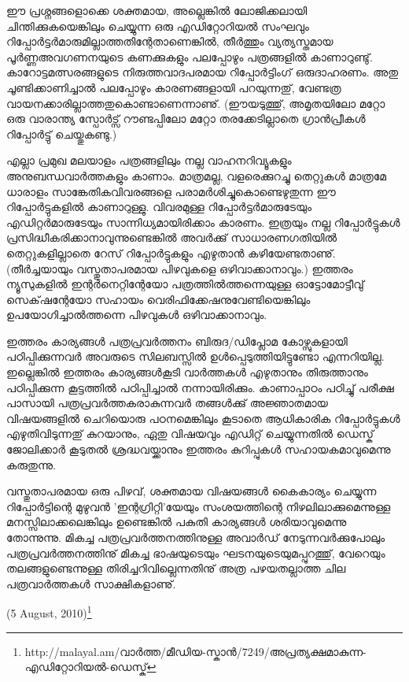 ഈ പ്രശ്നങ്ങളൊക്കെ ശക്തമായ, അല്ലെങ്കില്‍ ലോജിക്കലായി ചിന്തിക്കുകയെങ്കിലും ചെയ്യുന്ന ഒരു എഡിറ്റോറിയല്‍ 
സംഘവും റിപ്പോര്‍ട്ടര്‍മാരുമില്ലാത്തതിന്റേതാണെങ്കില്‍, തീര്‍ത്തും വ്യത്യസ്തമായ പൂര്‍ണ്ണഅവഗണനയുടെ കണക്കുകളും 
പലപ്പോഴും പത്രങ്ങളില്‍ കാണാറുണ്ടു്. കാറോട്ടമത്സരങ്ങളുടെ നിരുത്തവാദപരമായ റിപ്പോര്‍ട്ടിംഗ് ഒരുദാഹരണം. അതു 
ചൂണ്ടിക്കാണിച്ചാല്‍ പലപ്പോഴും കാരണങ്ങളായി പറയുന്നതു്, വേണ്ടത്ര വായനക്കാരില്ലാത്തതുകൊണ്ടാണെന്നാണു്. 
(ഈയടുത്തു്, അമൃതയിലോ മറ്റോ ഒരു വാരാന്ത്യ സ്പോര്‍ട്സ് റൗണ്ടപ്പിലോ മറ്റോ തരക്കേടില്ലാതെ ഗ്രാന്‍പ്രീകള്‍ 
റിപ്പോര്‍ട്ടു് ചെയ്തുകണ്ടു.)

എല്ലാ പ്രമുഖ മലയാളം പത്രങ്ങളിലും നല്ല വാഹനറിവ്യൂകളും അനുബന്ധവാര്‍ത്തകളും കാണാം. മാത്രമല്ല, വളരെക്കുറച്ചു 
തെറ്റുകള്‍ മാത്രമേ ധാരാളം സാങ്കേതികവിവരങ്ങളെ പരാമര്‍ശിച്ചുകൊണ്ടെഴുതുന്ന ഈ റിപ്പോര്‍ട്ടുകളില്‍ കാണാറുള്ളു. 
വിവരമുള്ള റിപ്പോര്‍ട്ടര്‍മാരുടേയും എഡിറ്റര്‍മാരുടേയും സാന്നിധ്യമായിരിക്കാം കാരണം. ഇത്രയും നല്ല റിപ്പോര്‍ട്ടുകള്‍ 
പ്രസിദ്ധീകരിക്കാനാവുന്നുണ്ടെങ്കില്‍ അവര്‍ക്കു് സാധാരണഗതിയില്‍ തെറ്റുകളില്ലാതെ റേസ് റിപ്പോര്‍ട്ടുകളും എഴുതാന്‍ 
കഴിയേണ്ടതാണു്. (തീര്‍ച്ചയായും വസ്തുതാപരമായ പിഴവുകളെ ഒഴിവാക്കാനാവും.) ഇത്തരം ന്യൂസുകളില്‍ ഇന്റര്‍നെറ്റിന്റേയോ പത്രത്തില്‍ത്തന്നെയുള്ള 
ഓട്ടോമോട്ടീവു് സെക്‌ഷന്റേയോ സഹായം വെരിഫിക്കേഷനുവേണ്ടിയെങ്കിലും ഉപയോഗിച്ചാല്‍ത്തന്നെ പിഴവുകള്‍ 
ഒഴിവാക്കാനാവും.

ഇത്തരം കാര്യങ്ങള്‍ പത്രപ്രവര്‍ത്തനം ബിരുദ/ഡിപ്ലോമ കോഴ്സുകളായി പഠിപ്പിക്കുന്നവര്‍ അവരുടെ സിലബസ്സില്‍ 
ഉള്‍പ്പെടുത്തിയിട്ടുണ്ടോ എന്നറിയില്ല. ഇല്ലെങ്കില്‍ ഇത്തരം കാര്യങ്ങള്‍കൂടി വാര്‍ത്തകള്‍ എഴുതാനും തിരുത്താനും 
പഠിപ്പിക്കുന്ന കൂട്ടത്തില്‍ പഠിപ്പിച്ചാല്‍ നന്നായിരിക്കും. കാണാപ്പാഠം പഠിച്ചു് പരീക്ഷ പാസായി പത്രപ്രവര്‍ത്തകരാകുന്നവര്‍
തങ്ങള്‍ക്കു് അജ്ഞാതമായ വിഷയങ്ങളില്‍ ചെറിയൊരു പഠനമെങ്കിലും കൂടാതെ ആധികാരിക റിപ്പോര്‍ട്ടുകള്‍ 
എഴുതിവിടുന്നതു് കുറയാനും, ഏതു വിഷയവും എഡിറ്റ് ചെയ്യുന്നതില്‍ ഡെസ്ക് ജോലിക്കാര്‍ കൂടുതല്‍ ശ്രദ്ധവയ്ക്കാനും 
ഇത്തരം കുറിപ്പുകള്‍ സഹായകമാവുമെന്നു കരുതുന്നു.

വസ്തുതാപരമായ ഒരു പിഴവ്, ശക്തമായ വിഷയങ്ങള്‍ കൈകാര്യം ചെയ്യുന്ന റിപ്പോര്‍ട്ടിന്റെ മുഴുവന്‍ 'ഇന്റഗ്രിറ്റി'യേയും 
സംശയത്തിന്റെ നിഴലിലാക്കുമെന്നുള്ള മനസ്സിലാക്കലെങ്കിലും ഉണ്ടെങ്കില്‍ പകുതി കാര്യങ്ങള്‍ ശരിയാവുമെന്നു തോന്നുന്നു. 
മികച്ച പത്രപ്രവര്‍ത്തനത്തിനുള്ള അവാര്‍ഡ് നേടുന്നവര്‍ക്കുപോലും പത്രപ്രവര്‍ത്തനത്തിനു് മികച്ച ഭാഷയുടെയും 
ഘടനയുടെയുമപ്പുറത്തു്, വേറെയും തലങ്ങളുണ്ടെന്നുള്ള തിരിച്ചറിവില്ലെന്നതിനു് അത്ര പഴയതല്ലാത്ത ചില 
പത്രവാര്‍ത്തകള്‍ സാക്ഷികളാണു്.

\hspace*{2em}(5 August, 2010)\footnote{http://malayal.am/വാര്‍ത്ത/മീഡിയ-സ്കാന്‍/7249/അപ്രത്യക്ഷമാകുന്ന-എഡിറ്റോറിയല്‍-ഡെസ്ക്}

\newpage
